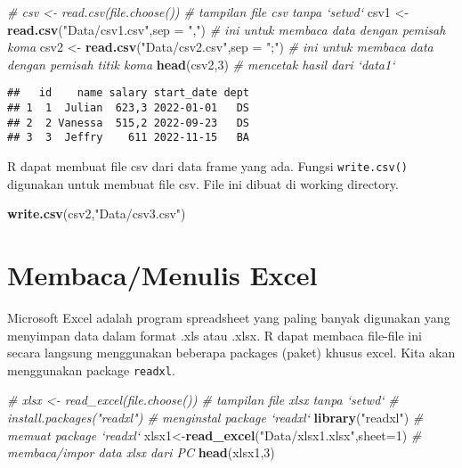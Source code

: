 \documentclass[
]{book}
\newenvironment{Shaded}{\begin{snugshade}}{\end{snugshade}}
\newcommand{\CommentTok}[1]{\textcolor[rgb]{0.56,0.35,0.01}{\textit{#1}}}
\newcommand{\DataTypeTok}[1]{\textcolor[rgb]{0.13,0.29,0.53}{#1}}
\newcommand{\DecValTok}[1]{\textcolor[rgb]{0.00,0.00,0.81}{#1}}
\newcommand{\KeywordTok}[1]{\textcolor[rgb]{0.13,0.29,0.53}{\textbf{#1}}}
\newcommand{\NormalTok}[1]{#1}
\newcommand{\StringTok}[1]{\textcolor[rgb]{0.31,0.60,0.02}{#1}}
\begin{document}
\begin{Shaded}
\begin{Highlighting}[]
\CommentTok{# csv <- read.csv(file.choose())                  # tampilan file csv tanpa `setwd`}
\NormalTok{csv1 <-}\StringTok{ }\KeywordTok{read.csv}\NormalTok{(}\StringTok{"Data/csv1.csv"}\NormalTok{,}\DataTypeTok{sep =} \StringTok{","}\NormalTok{)       }\CommentTok{# ini untuk membaca data dengan pemisah koma}
\NormalTok{csv2 <-}\StringTok{ }\KeywordTok{read.csv}\NormalTok{(}\StringTok{"Data/csv2.csv"}\NormalTok{,}\DataTypeTok{sep =} \StringTok{";"}\NormalTok{)       }\CommentTok{# ini untuk membaca data dengan pemisah titik koma }
\KeywordTok{head}\NormalTok{(csv2,}\DecValTok{3}\NormalTok{)                                      }\CommentTok{# mencetak hasil dari `data1` }
\end{Highlighting}
\end{Shaded}

\begin{verbatim}
##   id    name salary start_date dept
## 1  1  Julian  623,3 2022-01-01   DS
## 2  2 Vanessa  515,2 2022-09-23   DS
## 3  3  Jeffry    611 2022-11-15   BA
\end{verbatim}

R dapat membuat file csv dari data frame yang ada. Fungsi \texttt{write.csv()} digunakan untuk membuat file csv. File ini dibuat di working directory.

\begin{Shaded}
\begin{Highlighting}[]
\KeywordTok{write.csv}\NormalTok{(csv2,}\StringTok{"Data/csv3.csv"}\NormalTok{)}
\end{Highlighting}
\end{Shaded}

\hypertarget{membacamenulis-excel}{%
\section{Membaca/Menulis Excel}\label{membacamenulis-excel}}

Microsoft Excel adalah program spreadsheet yang paling banyak digunakan yang menyimpan data dalam format .xls atau .xlsx. R dapat membaca file-file ini secara langsung menggunakan beberapa packages (paket) khusus excel. Kita akan menggunakan package \texttt{readxl}.

\begin{Shaded}
\begin{Highlighting}[]
\CommentTok{# xlsx <- read_excel(file.choose())                # tampilan file xlsx tanpa `setwd`}
\CommentTok{# install.packages("readxl")                       # menginstal package `readxl` }
\KeywordTok{library}\NormalTok{(}\StringTok{"readxl"}\NormalTok{)                                  }\CommentTok{# memuat package `readxl`}
\NormalTok{xlsx1<-}\KeywordTok{read_excel}\NormalTok{(}\StringTok{"Data/xlsx1.xlsx"}\NormalTok{,}\DataTypeTok{sheet=}\DecValTok{1}\NormalTok{)       }\CommentTok{# membaca/impor data xlsx dari PC}
\KeywordTok{head}\NormalTok{(xlsx1,}\DecValTok{3}\NormalTok{)        }
\end{Highlighting}
\end{Shaded}
\end{document}
